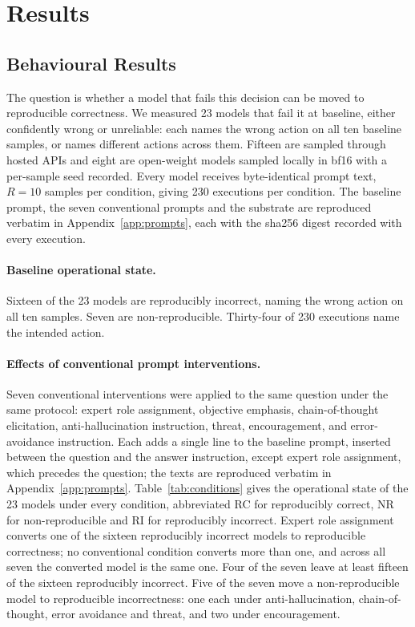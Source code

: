 \section{Results}
\label{sec:results}

\subsection{Behavioural Results}
\label{sec:behavioural-results}

The question is whether a model that fails this decision can be moved to
reproducible correctness. We measured 23 models that fail it at baseline, either
confidently wrong or unreliable: each names the wrong action on all ten baseline
samples, or names different actions across them. Fifteen are sampled
through hosted APIs and eight are open-weight models sampled locally in bf16 with a
per-sample seed recorded. Every model receives byte-identical prompt text, $R=10$
samples per condition, giving 230 executions per condition. The baseline prompt,
the seven conventional prompts and the substrate are reproduced verbatim in
Appendix~\ref{app:prompts}, each with the sha256 digest recorded with every
execution.

\paragraph{Baseline operational state.}
Sixteen of the 23 models are reproducibly incorrect, naming the wrong action on all
ten samples. Seven are non-reproducible. Thirty-four of 230 executions name the
intended action.

\paragraph{Effects of conventional prompt interventions.}
Seven conventional interventions were applied to the same question under the same
protocol: expert role assignment, objective emphasis, chain-of-thought elicitation,
anti-hallucination instruction, threat, encouragement, and error-avoidance
instruction. Each adds a single line to the baseline prompt, inserted between the
question and the answer instruction, except expert role assignment, which precedes
the question; the texts are reproduced verbatim in Appendix~\ref{app:prompts}.
Table~\ref{tab:conditions} gives the operational state of the 23 models under every
condition, abbreviated RC for reproducibly correct, NR for non-reproducible and RI
for reproducibly incorrect. Expert role assignment converts one of the
sixteen reproducibly incorrect models to reproducible correctness; no conventional
condition converts more than one, and across all seven the converted model is the
same one. Four of the seven leave at least fifteen of the sixteen reproducibly
incorrect. Five of the seven move a non-reproducible model to reproducible
incorrectness: one each under anti-hallucination, chain-of-thought, error avoidance
and threat, and two under encouragement.

